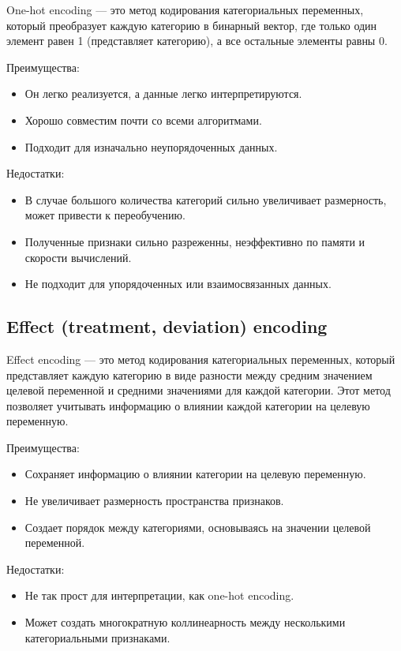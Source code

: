 One-hot encoding — это метод кодирования категориальных переменных, который преобразует каждую категорию в бинарный вектор, где только один элемент равен 1 (представляет категорию), а все остальные элементы равны 0.

Преимущества:
\begin{itemize}
    \item Он легко реализуется, а данные легко интерпретируются.
    \item Хорошо совместим почти со всеми алгоритмами.
    \item Подходит для изначально неупорядоченных данных.
\end{itemize}

Недостатки:
\begin{itemize}
    \item В случае большого количества категорий сильно увеличивает размерность, может привести к переобучению.
    \item Полученные признаки сильно разреженны, неэффективно по памяти и скорости вычислений.
    \item Не подходит для упорядоченных или взаимосвязанных данных.
\end{itemize}

\subsection*{Effect (treatment, deviation) encoding}

Effect encoding  — это метод кодирования категориальных переменных, который представляет каждую категорию в виде разности между средним значением целевой переменной и средними значениями для каждой категории. Этот метод позволяет учитывать информацию о влиянии каждой категории на целевую переменную.

Преимущества:
\begin{itemize}
    \item Сохраняет информацию о влиянии категории на целевую переменную.
    \item Не увеличивает размерность пространства признаков.
    \item Создает порядок между категориями, основываясь на значении целевой переменной.
\end{itemize}

Недостатки:
\begin{itemize}
    \item Не так прост для интерпретации, как one-hot encoding.
    \item Может создать многократную коллинеарность между несколькими категориальными признаками.
\end{itemize}


